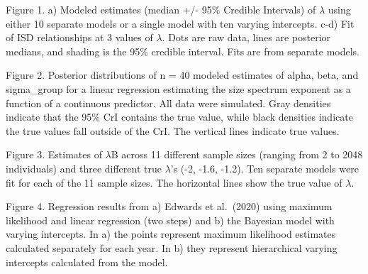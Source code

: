 \documentclass[
  12pt,
]{article}
\begin{document}
Figure 1. a) Modeled estimates (median +/- 95\% Credible Intervals) of
\(\lambda\) using either 10 separate models or a single model with ten
varying intercepts. c-d) Fit of ISD relationships at 3 values of
\(\lambda\). Dots are raw data, lines are posterior medians, and shading
is the 95\% credible interval. Fits are from separate models.

Figure 2. Posterior distributions of n = 40 modeled estimates of alpha,
beta, and sigma\_group for a linear regression estimating the size
spectrum exponent as a function of a continuous predictor. All data were
simulated. Gray densities indicate that the 95\% CrI contains the true
value, while black densities indicate the true values fall outside of
the CrI. The vertical lines indicate true values.

Figure 3. Estimates of \(\lambda\)B across 11 different sample sizes
(ranging from 2 to 2048 individuals) and three different true
\(\lambda\)'s (-2, -1.6, -1.2). Ten separate models were fit for each of
the 11 sample sizes. The horizontal lines show the true value of
\(\lambda\).

Figure 4. Regression results from a) Edwards et al.~(2020) using maximum
likelihood and linear regression (two steps) and b) the Bayesian model
with varying intercepts. In a) the points represent maximum likelihood
estimates calculated separately for each year. In b) they represent
hierarchical varying intercepts calculated from the model.
\end{document}
